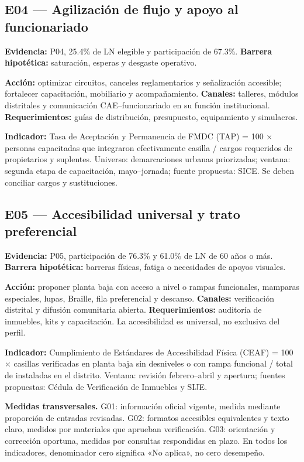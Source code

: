 \documentclass[11pt]{article}
\begin{document}
\subsection{E04 --- Agilización de flujo y apoyo al funcionariado}
\textbf{Evidencia:} P04, 25.4\% de LN elegible y participación de 67.3\%.
\textbf{Barrera hipotética:} saturación, esperas y desgaste operativo.

\textbf{Acción:} optimizar circuitos, canceles reglamentarios y señalización accesible; fortalecer capacitación, mobiliario y acompañamiento.
\textbf{Canales:} talleres, módulos distritales y comunicación CAE--funcionariado en su función institucional.
\textbf{Requerimientos:} guías de distribución, presupuesto, equipamiento y simulacros.

\textbf{Indicador:} Tasa de Aceptación y Permanencia de FMDC (TAP) = 100 $\times$ personas capacitadas que integraron efectivamente casilla / cargos requeridos de propietarios y suplentes. Universo: demarcaciones urbanas priorizadas; ventana: segunda etapa de capacitación, mayo--jornada; fuente propuesta: SICE. Se deben conciliar cargos y sustituciones.

\subsection{E05 --- Accesibilidad universal y trato preferencial}
\textbf{Evidencia:} P05, participación de 76.3\% y 61.0\% de LN de 60 años o más.
\textbf{Barrera hipotética:} barreras físicas, fatiga o necesidades de apoyos visuales.

\textbf{Acción:} proponer planta baja con acceso a nivel o rampas funcionales, mamparas especiales, lupas, Braille, fila preferencial y descanso.
\textbf{Canales:} verificación distrital y difusión comunitaria abierta.
\textbf{Requerimientos:} auditoría de inmuebles, kits y capacitación. La accesibilidad es universal, no exclusiva del perfil.

\textbf{Indicador:} Cumplimiento de Estándares de Accesibilidad Física (CEAF) = 100 $\times$ casillas verificadas en planta baja sin desniveles o con rampa funcional / total de instaladas en el distrito. Ventana: revisión febrero--abril y apertura; fuentes propuestas: Cédula de Verificación de Inmuebles y SIJE.

\textbf{Medidas transversales.} G01: información oficial vigente, medida mediante proporción de entradas revisadas. G02: formatos accesibles equivalentes y texto claro, medidos por materiales que aprueban verificación. G03: orientación y corrección oportuna, medidas por consultas respondidas en plazo. En todos los indicadores, denominador cero significa «No aplica», no cero desempeño.
\end{document}
